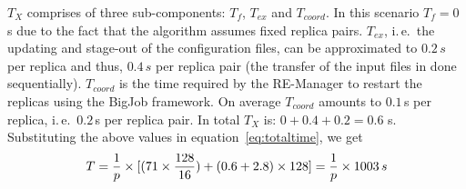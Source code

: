\documentclass{rspublic}
\newcommand{\jhanote}[1]{ {\textcolor{red} { ***shantenu: #1 }}}
\newcommand{\alnote}[1]{ {\textcolor{blue} { ***andre: #1 }}}
\newcommand{\athotanote}[1]{ {\textcolor{green} { ***athota: #1 }}}
\newcommand{\alnote}[1]{}
\newcommand{\athotanote}[1]{}
\newcommand{\jhanote}[1]{}
\begin{document}
$T_{X}$ comprises of three sub-components: $T_f$, $T_{ex}$ and $T_{coord}$.
In this scenario $T_{f}=0$\,s due to the fact that the algorithm
assumes fixed replica pairs.  $T_{ex}$, i.\,e.\ the
updating and stage-out of the configuration files, can be
approximated to $0.2\,s$ per replica and thus, $0.4\,s$ per
replica pair (the transfer of the input files in done sequentially).
$T_{coord}$ is the time required by the RE-Manager to restart the
replicas using the BigJob framework.
On average $T_{coord}$ amounts to $0.1$\,s per replica, i.\,e.\
$0.2$\,s per replica pair. In total $T_{X}$ is: $0+0.4+0.2=0.6$ s.
Substituting the above values in equation~\ref{eq:totaltime}, we get
\begin{eqnarray}
  T=  {1 \over p} \times {[ {(71\times {128\over 16}})+ (0.6 + 2.8)\times 128]} = {1 \over p} \times 1003\,s
\label{eq:sync}
\end{eqnarray}


\end{document}
